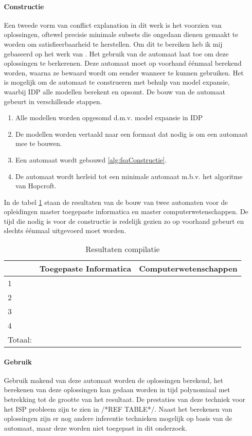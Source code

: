 \paragraph{Constructie}
Een tweede vorm van conflict explanation in dit werk is het voorzien van oplossingen, oftewel precisie minimale subsets die ongedaan dienen gemaakt te worden om satisfieerbaarheid te herstellen. Om dit te bereiken heb ik mij gebaseerd op het werk van \citep{amilhastre2002consistency}. Het gebruik van de automaat laat toe om deze oplossingen te berkerenen. Deze automaat moet op voorhand \'{e}\'{e}nmaal berekend worden, waarna ze bewaard wordt om eender wanneer te kunnen gebruiken. Het is mogelijk om de automaat te construeren met behulp van model expansie, waarbij IDP alle modellen berekent en opsomt. De bouw van de automaat gebeurt in verschillende stappen. 
\begin{enumerate}
\item Alle modellen worden opgesomd d.m.v. model expansie in IDP
\item De modellen worden vertaald naar een formaat dat nodig is om een automaat mee te bouwen.
\item Een automaat wordt gebouwd \ref{alg:fsaConstructie}.
\item De automaat wordt herleid tot een minimale automaat m.b.v. het algoritme van Hopcroft.
\end{enumerate}
In de tabel \ref{tab:compilatie} staan de resultaten van de bouw van twee automaten voor de opleidingen master toegepaste informatica en master computerwetenschappen. De tijd die nodig is voor de constructie is redelijk gezien zo op voorhand gebeurt en slechts \'{e}\'{e}nmaal uitgevoerd moet worden.
\begin{table}[]
\centering
\caption{Resultaten compilatie}
\label{tab:compilatie}
\begin{tabular}{|l|l|l|}
\hline
 & Toegepaste Informatica & Computerwetenschappen \\ \hline
1 &  &  \\ \hline
2 &  &  \\ \hline
3 &  &  \\ \hline
4 &  &  \\ \hline
Totaal: &  &  \\ \hline
\end{tabular}
\end{table}

\paragraph{Gebruik}
Gebruik makend van deze automaat worden de oplossingen berekend,  het berekenen van deze oplossingen kan gedaan worden in tijd polynomiaal met betrekking tot de grootte van het resultaat. De prestaties van deze techniek voor het ISP probleem zijn te zien in /*REF TABLE*/. Naast het berekenen van oplossingen zijn er nog andere inferentie technieken mogelijk op basis van de automaat, maar deze worden niet toegepast in dit onderzoek.

